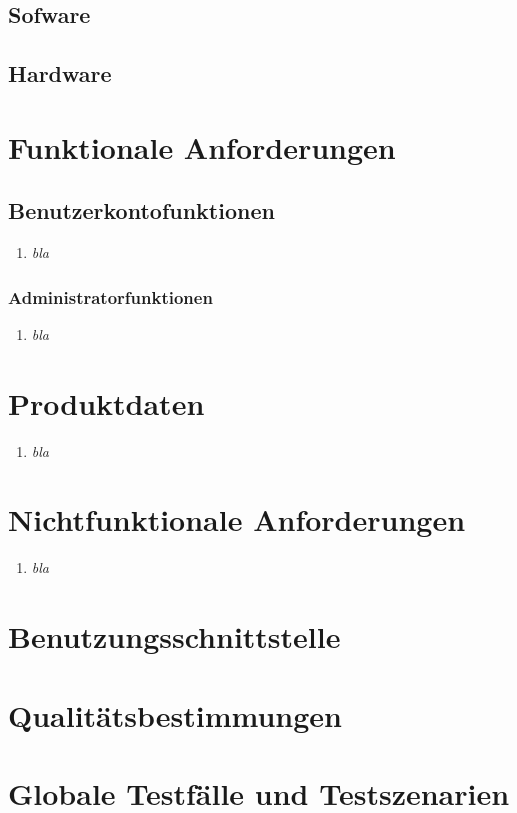 \documentclass[parskip=full,11pt]{scrartcl}
\def\threedigits#1{%
  \ifnum#1<100 0\fi
  \ifnum#1<10 0\fi
  \number#1}
\begin{document}
\subsection{Sofware}
\subsection{Hardware}


\section{Funktionale Anforderungen}
\subsection{Benutzerkontofunktionen}
\begin{enumerate}[label={\textbf{/F\protect\threedigits{\theenumi}}}, leftmargin=*]
\item \textit{bla}
\end{enumerate}

\subsubsection{Administratorfunktionen}
\begin{enumerate}[label={\textbf{/F\protect\threedigits{\theenumi}}}, leftmargin=*]
\item \textit{bla}
\end{enumerate}

\section{Produktdaten}
\begin{enumerate}[label={\textbf{/D\protect\threedigits{\theenumi}}}, leftmargin=*]
\item \textit{bla}
\end{enumerate}
\section{Nichtfunktionale Anforderungen}
\begin{enumerate}[label={\textbf{/NF\protect\threedigits{\theenumi}}}, leftmargin=*]
\item \textit{bla}
\end{enumerate}



\section{Benutzungsschnittstelle}

\section{Qualitätsbestimmungen}

\section{Globale Testfälle und Testszenarien}

\newpage
\printglossary	
\end{document}
